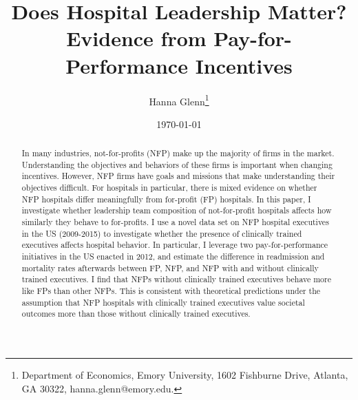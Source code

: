 \documentclass[12pt]{article}
\begin{document}
	
	
	
	
	\linespread{1.2}\title{\vspace{-0.5in} Does Hospital Leadership Matter?\\ \large Evidence from Pay-for-Performance Incentives} 
	
	\date{\today}
	
	\author{\vspace{10mm}Hanna Glenn\footnote{Department of Economics, Emory University, 1602 Fishburne Drive, Atlanta, GA 30322, hanna.glenn@emory.edu.} }
	
	\maketitle
	
	\vspace{-0.2in}
	
	\singlespacing\maketitle


 \vspace{3mm}
	
    \begin{abstract}
		{\small
        In many industries, not-for-profits (NFP) make up the majority of firms in the market. Understanding the objectives and behaviors of these firms is important when changing incentives. However, NFP firms have goals and missions that make understanding their objectives difficult. For hospitals in particular, there is mixed evidence on whether NFP hospitals differ meaningfully from for-profit (FP) hospitals. In this paper, I investigate whether leadership team composition of not-for-profit hospitals affects how similarly they behave to for-profits. I use a novel data set on NFP hospital executives in the US (2009-2015) to investigate whether the presence of clinically trained executives affects hospital behavior. In particular, I leverage two pay-for-performance initiatives in the US enacted in 2012, and estimate the difference in readmission and mortality rates afterwards between FP, NFP, and NFP with and without clinically trained executives. I find that NFPs without clinically trained executives behave more like FPs than other NFPs. This is consistent with theoretical predictions under the assumption that NFP hospitals with clinically trained executives value societal outcomes more than those without clinically trained executives.
		} 
	\end{abstract}
	
\end{document}
